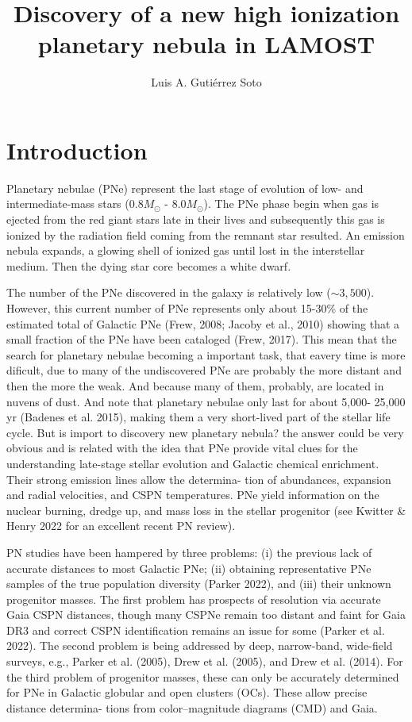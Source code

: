 \documentclass{article}
\title{Discovery of a new high  ionization planetary nebula in LAMOST}
\author{Luis A. Gutiérrez Soto     
}
\newcommand\msol{M_\odot}
\begin{document}
\maketitle

\section{Introduction}
\label{sec:intro}

Planetary nebulae (PNe) represent the last stage of evolution of low- and intermediate-mass stars
(0.8$\msol$ - 8.0$\msol$). The PNe phase begin when gas is ejected from the red giant stars late
in their lives and subsequently this gas is ionized by the radiation field coming from the remnant
star resulted. An emission nebula expands, a glowing shell of ionized gas until lost in the
interstellar medium. Then the dying star core becomes a white dwarf.

The number of the PNe discovered in the galaxy is relatively low (\(\sim 3,500\)). However,
this current number of PNe represents only about 15-30\% of the estimated
total of Galactic PNe (Frew, 2008; Jacoby et al., 2010) showing that a small fraction
of the PNe have been cataloged (Frew, 2017). This mean that the search for planetary nebulae
becoming a important task, that eavery time is more dificult, due to many of the undiscovered PNe are probably
the more distant and then the more the weak. And because many of them, probably, are located
in nuvens of dust. And note that planetary nebulae only last for about 5,000-
25,000 yr (Badenes et al. 2015), making them a very short-lived part of the stellar life cycle.
But is import to discovery new planetary nebula? the answer could be very obvious and is
related with the idea that PNe provide vital clues for the understanding late-stage stellar
evolution and Galactic chemical enrichment. Their strong emission lines allow the determina-
tion of abundances, expansion and radial velocities, and
CSPN temperatures. PNe yield information on the nuclear
burning, dredge up, and mass loss in the stellar progenitor
(see Kwitter & Henry 2022 for an excellent recent PN
review).

PN studies have been hampered by three problems:
(i) the previous lack of accurate distances to most Galactic
PNe; (ii) obtaining representative PNe samples of the true
population diversity (Parker 2022), and (iii) their unknown
progenitor masses. The first problem has prospects of
resolution via accurate Gaia CSPN distances, though many
CSPNe remain too distant and faint for Gaia DR3 and correct
CSPN identification remains an issue for some (Parker et al.
2022). The second problem is being addressed by deep, narrow-band,
wide-field surveys, e.g., Parker et al. (2005),
Drew et al. (2005), and Drew et al. (2014). For the third problem
of progenitor masses, these can only
be accurately determined for PNe in Galactic globular and
open clusters (OCs). These allow precise distance determina-
tions from color–magnitude diagrams (CMD) and Gaia.
\end{document}
